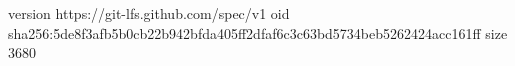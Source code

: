 version https://git-lfs.github.com/spec/v1
oid sha256:5de8f3afb5b0cb22b942bfda405ff2dfaf6c3c63bd5734beb5262424acc161ff
size 3680
